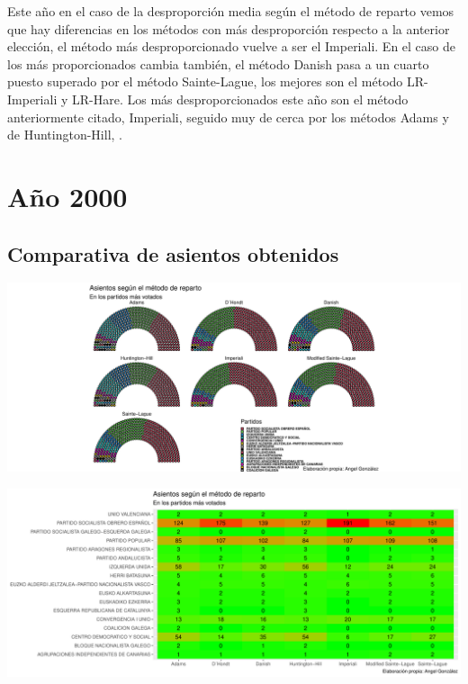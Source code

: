 \documentclass[12pt,a4paper,]{book}
\numberwithin{dummy}{section}
\theoremstyle{ocrenumbox}
\theoremstyle{blacknumex}
\theoremstyle{blacknumbox}
\theoremstyle{ocrenum}
\theoremstyle{ocrenum}
\begin{document}
Este año en el caso de la desproporción media según el método de reparto
vemos que hay diferencias en los métodos con más desproporción respecto
a la anterior elección, el método más desproporcionado vuelve a ser el
Imperiali. En el caso de los más proporcionados cambia también, el
método Danish pasa a un cuarto puesto superado por el método
Sainte-Lague, los mejores son el método LR-Imperiali y LR-Hare. Los más
desproporcionados este año son el método anteriormente citado,
Imperiali, seguido muy de cerca por los métodos Adams y de
Huntington-Hill, .

\hypertarget{auxf1o-2000}{%
\section{Año 2000}\label{auxf1o-2000}}

\hypertarget{comparativa-de-asientos-obtenidos-7}{%
\subsection{Comparativa de asientos
obtenidos}\label{comparativa-de-asientos-obtenidos-7}}

\begin{center}\includegraphics[width=1\linewidth]{figurasR/unnamed-chunk-97-1} \end{center}

\begin{center}\includegraphics[width=1\linewidth]{figurasR/unnamed-chunk-97-2} \end{center}
\end{document}

